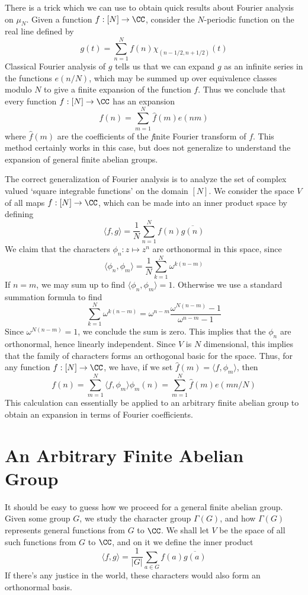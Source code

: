 There is a trick which we can use to obtain quick results about Fourier analysis on $\mu_N$. Given a function $f: [N] \to \CC$, consider the $N$-periodic function on the real line defined by
%
\[ g(t) = \sum_{n = 1}^N f(n) \chi_{(n-1/2,n+1/2)}(t) \]
%
Classical Fourier analysis of $g$ tells us that we can expand $g$ as an infinite series in the functions $e(n/N)$, which may be summed up over equivalence classes modulo $N$ to give a finite expansion of the function $f$. Thus we conclude that every function $f: [N] \to \CC$ has an expansion
%
\[ f(n) = \sum_{m = 1}^N \widehat{f}(m) e(nm) \]
%
where $\widehat{f}(m)$ are the coefficients of the {\emph finite Fourier transform} of $f$. This method certainly works in this case, but does not generalize to understand the expansion of general finite abelian groups.

The correct generalization of Fourier analysis is to analyze the set of complex valued `square integrable functions' on the domain $[N]$. We consider the space $V$ of all maps $f: [N] \to \CC$, which can be made into an inner product space by defining
%
\[ \langle f, g \rangle = \frac{1}{N} \sum_{n = 1}^N f(n) \overline{g(n)} \]
%
We claim that the characters $\phi_n: z \mapsto z^n$ are orthonormal in this space, since
%
\[ \langle \phi_n, \phi_m \rangle = \frac{1}{N} \sum_{k = 1}^N \omega^{k(n-m)} \]
%
If $n = m$, we may sum up to find $\langle \phi_n, \phi_m \rangle = 1$. Otherwise we use a standard summation formula to find
%
\[ \sum_{k = 1}^N \omega^{k(n-m)} = \omega^{n-m} \frac{\omega^{N(n-m)} - 1}{\omega^{n-m} -1} \]
%
Since $\omega^{N(n-m)} = 1$, we conclude the sum is zero. This implies that the $\phi_n$ are orthonormal, hence linearly independent. Since $V$ is $N$ dimensional, this implies that the family of characters forms an orthogonal basic for the space. Thus, for any function $f: [N] \to \CC$, we have, if we set $\widehat{f}(m) = \langle f, \phi_m \rangle$, then
%
\[ f(n) = \sum_{m = 1}^N \langle f, \phi_m \rangle \phi_m(n) = \sum_{m = 1}^N \widehat{f}(m) e(mn/N) \]
%
This calculation can essentially be applied to an arbitrary finite abelian group to obtain an expansion in terms of Fourier coefficients.

\section{An Arbitrary Finite Abelian Group}

It should be easy to guess how we proceed for a general finite abelian group. Given some group $G$, we study the character group $\Gamma(G)$, and how $\Gamma(G)$ represents general functions from $G$ to $\CC$. We shall let $V$ be the space of all such functions from $G$ to $\CC$, and on it we define the inner product
%
\[ \langle f, g \rangle = \frac{1}{|G|} \sum_{a \in G} f(a) \overline{g(a)} \]
%
If there's any justice in the world, these characters would also form an orthonormal basis.

